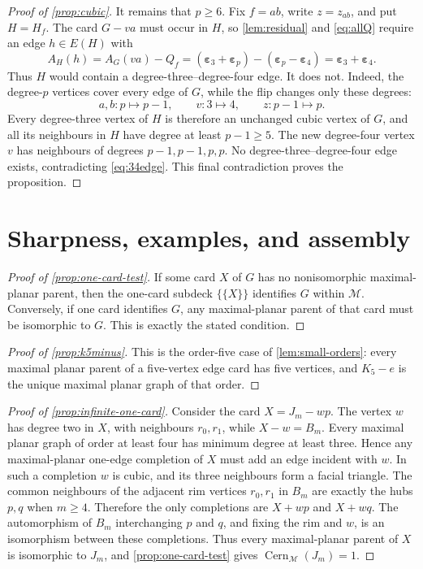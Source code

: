 \documentclass[11pt]{article}
\theoremstyle{definition}
\theoremstyle{remark}
\newcommand{\M}{\mathcal M}
\newcommand{\Cern}{\operatorname{Cern}}
\newcommand{\eps}{\boldsymbol\varepsilon}
\begin{document}
\begin{proof}[Proof of \cref{prop:cubic}]
It remains that \(p\ge6\).  Fix \(f=ab\), write \(z=z_{ab}\), and put
\(H=H_f\).  The card \(G-va\) must occur in \(H\), so
\cref{lem:residual} and \eqref{eq:allQ} require an edge \(h\in E(H)\) with
\[
  A_H(h)=A_G(va)-Q_f
        =(\eps_3+\eps_p)-(\eps_p-\eps_4)
        =\eps_3+\eps_4.                              \tag{E.6}\label{eq:34edge}
\]
Thus \(H\) would contain a degree-three--degree-four edge.  It does not.
Indeed, the degree-\(p\) vertices cover every edge of \(G\), while the flip
changes only these degrees:
\[
  a,b:p\mapsto p-1,\qquad v:3\mapsto4,
  \qquad z:p-1\mapsto p.
\]
Every degree-three vertex of \(H\) is therefore an unchanged cubic vertex of
\(G\), and all its neighbours in \(H\) have degree at least
\(p-1\ge5\).  The new degree-four vertex \(v\) has neighbours of degrees
\(p-1,p-1,p,p\).  No degree-three--degree-four edge exists, contradicting
\eqref{eq:34edge}.  This final contradiction proves the proposition.
\end{proof}

\section{Sharpness, examples, and assembly}\label{app:assembly}

\begin{proof}[Proof of \cref{prop:one-card-test}]
If some card \(X\) of \(G\) has no nonisomorphic maximal-planar parent, then
the one-card subdeck \(\{\!\{X\}\!\}\) identifies \(G\) within \(\M\).
Conversely, if one card identifies \(G\), any maximal-planar parent of that
card must be isomorphic to \(G\).  This is exactly the stated condition.
\end{proof}

\begin{proof}[Proof of \cref{prop:k5minus}]
This is the order-five case of \cref{lem:small-orders}: every maximal planar
parent of a five-vertex edge card has five vertices, and \(K_5-e\) is the
unique maximal planar graph of that order.
\end{proof}

\begin{proof}[Proof of \cref{prop:infinite-one-card}]
Consider the card \(X=J_m-wp\).  The vertex \(w\) has degree two in \(X\),
with neighbours \(r_0,r_1\), while \(X-w=B_m\).  Every maximal planar graph
of order at least four has minimum degree at least three.  Hence any
maximal-planar one-edge completion of \(X\) must add an edge incident with
\(w\).  In such a completion \(w\) is cubic, and its three neighbours form a
facial triangle.  The common neighbours of the adjacent rim vertices
\(r_0,r_1\) in \(B_m\) are exactly the hubs \(p,q\) when \(m\ge4\).
Therefore the only completions are \(X+wp\) and \(X+wq\).  The automorphism
of \(B_m\) interchanging \(p\) and \(q\), and fixing the rim and \(w\), is
an isomorphism between these completions.  Thus every maximal-planar parent
of \(X\) is isomorphic to \(J_m\), and \cref{prop:one-card-test} gives
\(\Cern_{\M}(J_m)=1\).
\end{proof}
\end{document}
